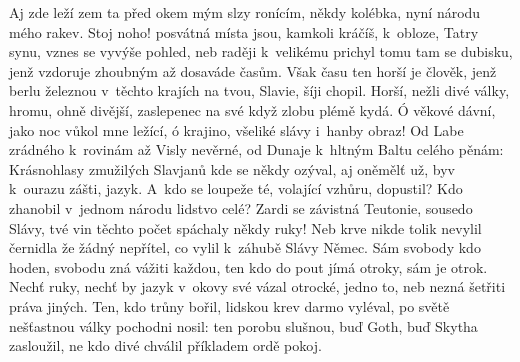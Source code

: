 Aj zde leží zem ta před okem mým slzy ronícím,
někdy kolébka, nyní národu mého rakev.
Stoj noho! posvátná místa jsou, kamkoli kráčíš,
k~obloze, Tatry synu, vznes se vyvýše pohled,
neb raději k~velikému prichyl tomu tam se dubisku,
jenž vzdoruje zhoubným až dosaváde časům.
Však času ten horší je člověk, jenž berlu železnou
v~těchto krajích na tvou, Slavie, šíji chopil.
Horší, nežli divé války, hromu, ohně divější,
zaslepenec na své když zlobu plémě kydá.
Ó věkové dávní, jako noc vůkol mne ležící,
ó krajino, všeliké slávy i~hanby obraz!
Od Labe zrádného k~rovinám až Visly nevěrné,
od Dunaje k~hltným Baltu celého pěnám:
Krásnohlasy zmužilých Slavjanů kde se někdy ozýval,
aj oněmělť už, byv k~ourazu zášti, jazyk.
A~kdo se loupeže té, volající vzhůru, dopustil?
Kdo zhanobil v~jednom národu lidstvo celé?
Zardi se závistná Teutonie, sousedo Slávy,
tvé vin těchto počet spáchaly někdy ruky!
Neb krve nikde tolik nevylil černidla že žádný
nepřítel, co vylil k~záhubě Slávy Němec.
Sám svobody kdo hoden, svobodu zná vážiti každou,
ten kdo do pout jímá otroky, sám je otrok.
Nechť ruky, nechť by jazyk v~okovy své vázal otrocké,
jedno to, neb nezná šetřiti práva jiných.
Ten, kdo trůny bořil, lidskou krev darmo vyléval,
po světě nešťastnou války pochodni nosil:
ten porobu slušnou, buď Goth, buď Skytha zasloužil,
ne kdo divé chválil příkladem ordě pokoj.
